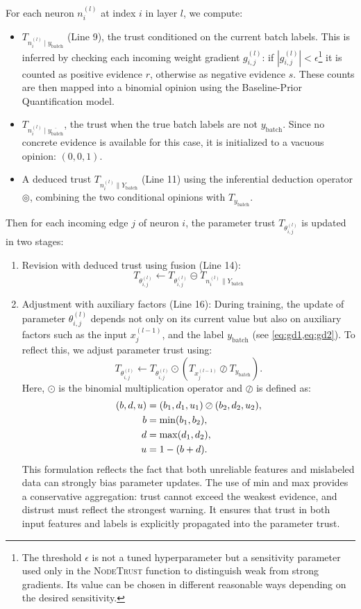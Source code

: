 For each neuron \(n_i^{(l)}\) at index \(i\) in layer \(l\), we compute:
\begin{itemize}
    \item \( T_{n_{i}^{(l)} \mid y_\text{batch}} \) (Line 9), the trust conditioned on the current batch labels. This is inferred by checking each incoming weight gradient \( g^{(l)}_{i,j} \): if \( |g^{(l)}_{i,j}| < \epsilon\)\footnote{The threshold $\epsilon$ is not a tuned hyperparameter but a sensitivity parameter used only in the \textsc{NodeTrust} function to distinguish weak from strong gradients. Its value can be chosen in different reasonable ways depending on the desired sensitivity.}
 it is counted as positive evidence \( r \), otherwise as negative evidence \( s \). These counts are then mapped into a binomial opinion using the Baseline-Prior Quantification model.
    \item \( T_{n_{i}^{(l)} \mid \overline{y_\text{batch}}} \), the trust when the true batch labels are not \( y_\text{batch} \). Since no concrete evidence is available for this case, it is initialized to a vacuous opinion: \( (0, 0, 1) \).
    \item A deduced trust \( T_{n_{i}^{(l)} \parallel Y_\text{batch}} \) (Line 11) using the inferential deduction operator \( \circledcirc \), combining the two conditional opinions with \( T_{y_\text{batch}} \).
\end{itemize}

Then for each incoming edge \( j\) of neuron \( i \), the parameter trust \( T_{\theta_{i,j}^{(l)}} \) is updated in two stages:
\begin{enumerate}
    \item Revision with deduced trust using fusion (Line 14):
    \[
    T_{\theta_{i,j}^{(l)}} \leftarrow T_{\theta_{i,j}^{(l)}} \circleddash T_{n_{i}^{(l)} \parallel Y_\text{batch}}
    \]
    \item Adjustment with auxiliary factors (Line 16):
    During training, the update of parameter $\theta_{i,j}^{(l)}$ depends not only on its current value but also on auxiliary factors such as the input $x^{(l-1)}_{j}$, and the label $y_\text{batch}$ (see \cref{eq:gd1,eq:gd2}).  
To reflect this, we adjust parameter trust using:
\[
    T_{\theta_{i,j}^{(l)}} \longleftarrow T_{\theta_{i,j}^{(l)}} \odot (T_{x_j^{(l-1)}} \oslash T_{y_\text{batch}}).
\]
Here, $\odot$ is the binomial multiplication operator and $\oslash$ is defined as:
\begin{align}
    (b,d,u) &= (b_1, d_1, u_1) \oslash (b_2, d_2, u_2), \\
    b &= \min(b_1, b_2), \notag \\
    d &= \max(d_1, d_2), \notag \\
    u &= 1 - (b+d). \notag
\end{align}
This formulation reflects the fact that both unreliable features and mislabeled data can strongly bias parameter updates. The use of min and max provides a conservative aggregation: trust cannot exceed the weakest evidence, and distrust must reflect the strongest warning. It ensures that trust in both input features and labels is explicitly propagated into the parameter trust.
\end{enumerate}

